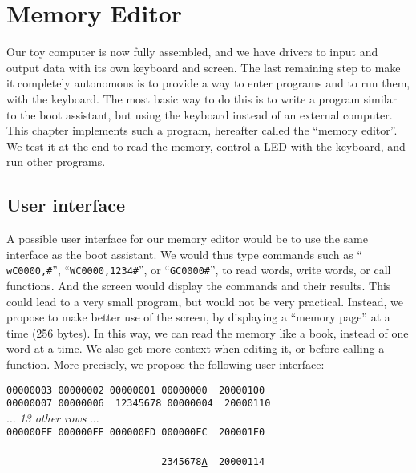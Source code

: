 
\renewcommand{\rustfile}{chapter7}
\setcounter{rustid}{0}


\chapter{Memory Editor}\label{chapter:memory-editor}

Our toy computer is now fully assembled, and we have drivers to input and
output data with its own keyboard and screen. The last remaining step to make
it completely autonomous is to provide a way to enter programs and to run them,
with the keyboard. The most basic way to do this is to write a program similar
to the boot assistant, but using the keyboard instead of an external computer.
This chapter implements such a program, hereafter called the ``memory editor''.
We test it at the end to read the memory, control a LED with the keyboard, and
run other programs.

\section{User interface}

A possible user interface for our memory editor would be to use the same
interface as the boot assistant. We would thus type commands such as ``{\tt
wC0000,\#}'', ``{\tt WC0000,1234\#}'', or ``{\tt GC0000\#}'', to read words,
write words, or call functions. And the screen would display the commands and
their results. This could lead to a very small program, but would not be very
practical. Instead, we propose to make better use of the screen, by displaying
a ``memory page'' at a time (256 bytes). In this way, we can read the memory
like a book, instead of one word at a time. We also get more context when
editing it, or before calling a function. More precisely, we propose the
following user interface:

\begin{flushleft}
{\tt 00000003 00000002 00000001 00000000 {\color{gray} 20000100}}\\
{\tt 00000007 00000006 {\color{green0} 12345678} 00000004 {\color{gray}
20000110}}\\
$\ldots$ {\em 13 other rows} $\ldots$\\
{\tt 000000FF 000000FE 000000FD 000000FC {\color{gray} 200001F0}}\\
~\\
{\tt ~~~~~~~~ ~~~~~~~~ ~~~~~~~~ 2345678\underline{A} {\color{gray} 20000114}}\\
\end{flushleft}

